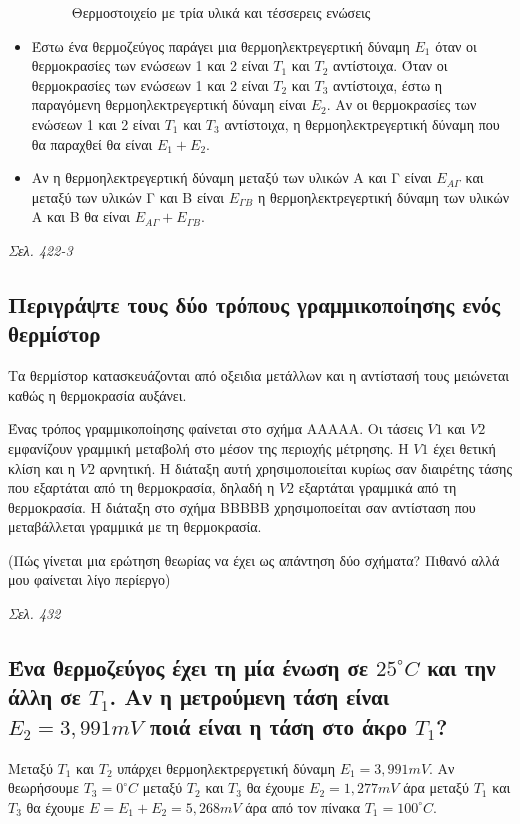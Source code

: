 \documentclass{article}
\begin{document}
\begin{itemize}
\begin{figure}[h!]
            \caption{Θερμοστοιχείο με τρία υλικά και τέσσερεις ενώσεις}
            \label{fig:7.1thermo2}
        \end{figure}
    \item Έστω ένα θερμοζεύγος παράγει μια θερμοηλεκτρεγερτική δύναμη $Ε_1$ όταν οι θερμοκρασίες των ενώσεων 1 και 2 είναι $Τ_1$ και $Τ_2$ αντίστοιχα. Όταν οι θερμοκρασίες των ενώσεων
        1 και 2 είναι $Τ_2$ και $Τ_3$ αντίστοιχα, έστω η παραγόμενη θερμοηλεκτρεγερτική δύναμη είναι $Ε_2$. Αν οι θερμοκρασίες των ενώσεων 1 και 2 είναι $Τ_1$ και $Τ_3$ αντίστοιχα, η
        θερμοηλεκτρεγερτική δύναμη που θα παραχθεί θα είναι $Ε_1+Ε_2$.
    \item Αν η θερμοηλεκτρεγερτική δύναμη μεταξύ των υλικών Α και Γ είναι $Ε_{A\Gamma}$ και μεταξύ των υλικών Γ και Β είναι $Ε_{\Gamma B}$ η θερμοηλεκτρεγερτική δύναμη των
        υλικών Α και Β θα είναι $Ε_{A\Gamma} + E_{\Gamma B}$.
\end{itemize}

\emph{Σελ. 422-3}

\subsection{Περιγράψτε τους δύο τρόπους γραμμικοποίησης ενός θερμίστορ}
Τα θερμίστορ κατασκευάζονται από οξειδια μετάλλων και η αντίστασή τους μειώνεται καθώς η θερμοκρασία αυξάνει. 

Ένας τρόπος γραμμικοποίησης φαίνεται στο σχήμα ΑΑΑΑΑ. Οι τάσεις $V1$ και $V2$ εμφανίζουν γραμμική μεταβολή στο μέσον της περιοχής μέτρησης. Η $V1$ έχει θετική κλίση 
και η $V2$ αρνητική. Η διάταξη αυτή χρησιμοποιείται κυρίως σαν διαιρέτης τάσης που εξαρτάται από τη θερμοκρασία, δηλαδή η $V2$ εξαρτάται γραμμικά από τη θερμοκρασία.
Η διάταξη στο σχήμα ΒΒΒΒΒ χρησιμοποείται σαν αντίσταση που μεταβάλλεται γραμμικά με τη θερμοκρασία.

(Πώς γίνεται μια ερώτηση θεωρίας να έχει ως απάντηση δύο σχήματα? Πιθανό αλλά μου φαίνεται λίγο περίεργο)

\emph{Σελ. 432}

\subsection{Ένα θερμοζεύγος έχει τη μία ένωση σε $25^{\circ} C$ και την άλλη σε $Τ_1$. Αν η μετρούμενη τάση είναι $E_2=3,991mV$ ποιά είναι η τάση στο άκρο $T_1$?}
Μεταξύ $Τ_1$ και $Τ_2$ υπάρχει θερμοηλεκτρεργετική δύναμη $Ε_1 = 3,991 mV$. Αν θεωρήσουμε $T_3 = 0^{\circ}C$ μεταξύ $T_2$ και $T_3$ θα έχουμε $E_2 = 1,277mV$ άρα μεταξύ 
$T_1$ και $T_3$ θα έχουμε $E = E_1 + E_2 = 5,268mV$ άρα από τον πίνακα $T_1 = 100^{\circ}C$.
\end{document}
